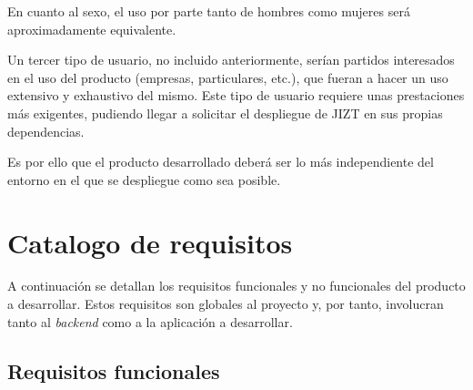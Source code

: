 En cuanto al sexo, el uso por parte tanto de hombres como mujeres será aproximadamente equivalente.

Un tercer tipo de usuario, no incluido anteriormente, serían partidos interesados en el uso del producto (empresas, particulares, etc.), que fueran a hacer un uso extensivo y exhaustivo del mismo. Este tipo de usuario requiere unas prestaciones más exigentes, pudiendo llegar a solicitar el despliegue de JIZT en sus propias dependencias.

Es por ello que el producto desarrollado deberá ser lo más independiente del entorno en el que se despliegue como sea posible.


\section{Catalogo de requisitos}

A continuación se detallan los requisitos funcionales y no funcionales del producto a desarrollar. Estos requisitos son globales al proyecto y, por tanto, involucran tanto al \emph{backend} como a la aplicación a desarrollar.

\subsection{Requisitos funcionales}

